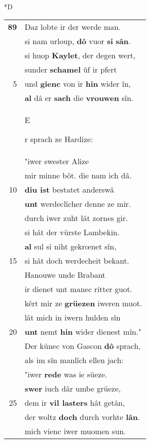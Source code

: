 \documentclass[8pt,a4paper,notitlepage]{article}
\begin{document}
\begin{table}[ht]
\begin{minipage}[t]{0.5\linewidth}
\small
\begin{center}*D
\end{center}
\begin{tabular}{rl}
\textbf{89} & Daz lobte ir der werde man.\\ 
 & si nam urloup, \textbf{dô} vuor \textbf{si} \textbf{sân}.\\ 
 & si huop \textbf{Kaylet}, der degen wert,\\ 
 & sunder \textbf{schamel} ûf ir pfert\\ 
5 & und \textbf{gienc} von ir \textbf{hin} wider în,\\ 
 & \textbf{al} dâ er \textbf{sach} die \textbf{vrouwen} sîn.\\ 
 & \begin{large}E\end{large}r sprach ze Hardize:\\ 
 & "iwer swester Alize\\ 
 & mir minne bôt. die nam ich dâ.\\ 
10 & \textbf{diu ist} bestatet anderswâ\\ 
 & \textbf{unt} werdeclîcher denne ze mir.\\ 
 & durch iwer zuht lât zornes gir.\\ 
 & si hât der vürste Lambekin.\\ 
 & \textbf{al} sul si niht gekrœnet sîn,\\ 
15 & si hât doch werdecheit bekant.\\ 
 & Hanouwe unde Brabant\\ 
 & ir dienet unt manec ritter guot.\\ 
 & kêrt mir ze \textbf{grüezen} iweren muot.\\ 
 & lât mich in iwern hulden sîn\\ 
20 & \textbf{unt} nemt \textbf{hin} wider dienest mîn."\\ 
 & Der künec von Gascon \textbf{dô} sprach,\\ 
 & als im sîn manlîch ellen jach:\\ 
 & "iwer \textbf{rede} was ie süeze.\\ 
 & \textbf{swer} iuch dâr umbe grüeze,\\ 
25 & dem ir \textbf{vil lasters} hât getân,\\ 
 & der woltz \textbf{doch} durch vorhte \textbf{lân}.\\ 
 & mich vienc iwer muomen sun.\\ 

\end{tabular}
\end{minipage}
\end{table}
\end{document}
